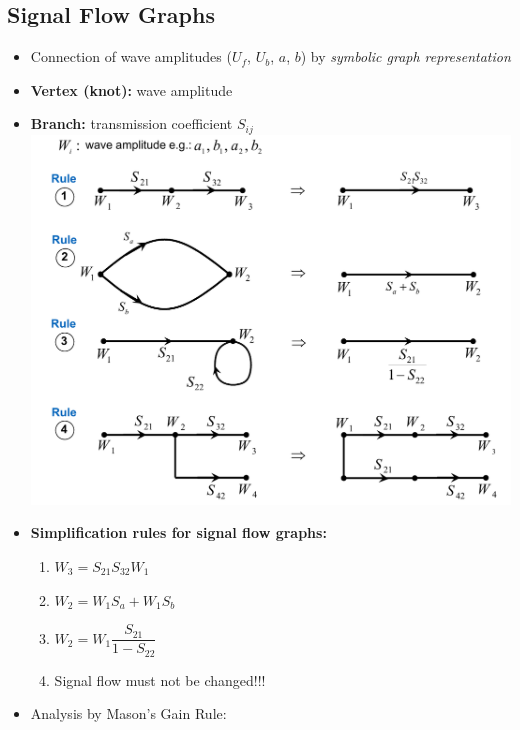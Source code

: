 \subsection{Signal Flow Graphs}
\begin{itemize}
    \itemsep0pt
    \item Connection of wave amplitudes ($U_f$, $U_b$, $a$, $b$) by \textit{symbolic graph representation}
    \item \textbf{Vertex (knot):} wave amplitude
    \item \textbf{Branch:} transmission coefficient $S_{ij}$
    \includegraphics[width=.3\paperheight]{content/hfcomp/pictures/rules_signal_flow_graph.png}
    \item \textbf{Simplification rules for signal flow graphs:}
        \begin{enumerate}
            \item \(W_3 = S_{21}S_{32} W_1\)
            \item \(W_2 = W_1 S_a + W_1 S_b\)
            \item \(W_2 = W_1 \dfrac{S_{21}}{1 - S_{22}}\)
            \item Signal flow must not be changed!!!
        \end{enumerate}
    \item Analysis by Mason's Gain Rule:
        \begin{itemize}
            \itemsep0pt

\end{itemize}
\end{itemize}
